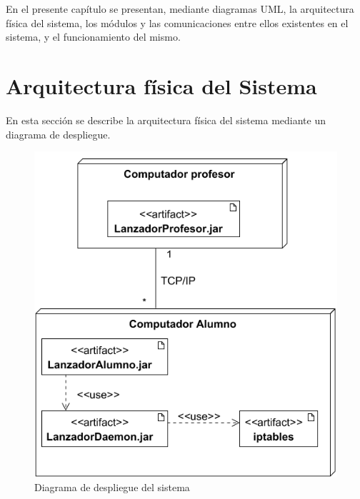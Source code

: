 

\label{chap:arquitectura}

En el presente capítulo se presentan, mediante diagramas UML, la arquitectura física del sistema, los módulos y las comunicaciones entre ellos existentes en el sistema, y el funcionamiento del mismo.


\chaptertoc

\section{Arquitectura física del Sistema}
\label{sec:arquitectura:arqFisica}

En esta sección se describe la arquitectura física del sistema mediante un diagrama de despliegue.
\begin{figure}
    \centering
    \includegraphics[width=\linewidth]{arquitectura/despliegueSistema2}
    \caption{Diagrama de despliegue del sistema}
    \label{fig:arquitectura:despliegueSistema}
\end{figure}
\newline


